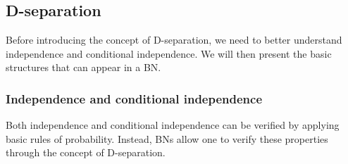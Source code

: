 \subsection{D-separation}
Before introducing the concept of D-separation, we need to better understand independence and conditional independence.
We will then present the basic structures that can appear in a BN.

\subsubsection{Independence and conditional independence}
\begin{figure}[H]
\end{figure}
\begin{figure}[H]
\end{figure}
Both independence and conditional independence can be verified by applying basic rules of probability.
Instead, BNs allow one to verify these properties through the concept of D-separation.

